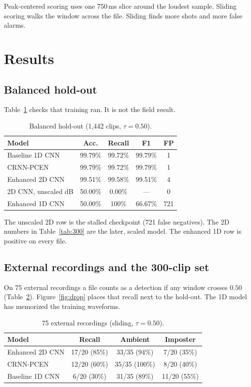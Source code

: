 \documentclass[conference]{IEEEtran}
\begin{document}
Peak-centered scoring uses one 750\,ms slice around the loudest sample. Sliding scoring walks the window across the file. Sliding finds more shots and more false alarms.

\section{Results}
\label{sec:results}

\subsection{Balanced hold-out}
Table~\ref{tab:holdout} checks that training ran. It is not the field result.

\begin{table}[!t]
\centering
\caption{Balanced hold-out (1{,}442 clips, $\tau = 0.50$).}
\label{tab:holdout}
\footnotesize
\begin{tabular}{lcccc}
\toprule
\textbf{Model} & \textbf{Acc.} & \textbf{Recall} & \textbf{F1} & \textbf{FP} \\
\midrule
Baseline 1D CNN & 99.79\% & 99.72\% & 99.79\% & 1 \\
CRNN-PCEN & 99.79\% & 99.72\% & 99.79\% & 1 \\
Enhanced 2D CNN & 99.51\% & 99.58\% & 99.51\% & 4 \\
2D CNN, unscaled dB & 50.00\% & 0.00\% & --- & 0 \\
Enhanced 1D CNN & 50.00\% & 100\% & 66.67\% & 721 \\
\bottomrule
\end{tabular}
\end{table}

The unscaled 2D row is the stalled checkpoint (721 false negatives). The 2D numbers in Table~\ref{tab:300} are the later, scaled model. The enhanced 1D row is positive on every file.

\subsection{External recordings and the 300-clip set}
On 75 external recordings a file counts as a detection if any window crosses $0.50$ (Table~\ref{tab:external}). Figure~\ref{fig:drop} places that recall next to the hold-out. The 1D model has memorized the training waveforms.

\begin{table}[!t]
\centering
\caption{75 external recordings (sliding, $\tau = 0.50$).}
\label{tab:external}
\footnotesize
\begin{tabular}{lccc}
\toprule
\textbf{Model} & \textbf{Recall} & \textbf{Ambient} & \textbf{Imposter} \\
\midrule
Enhanced 2D CNN & 17/20 (85\%) & 33/35 (94\%) & 7/20 (35\%) \\
CRNN-PCEN & 12/20 (60\%) & 35/35 (100\%) & 8/20 (40\%) \\
Baseline 1D CNN & 6/20 (30\%) & 31/35 (89\%) & 11/20 (55\%) \\
\bottomrule
\end{tabular}
\end{table}
\end{document}
